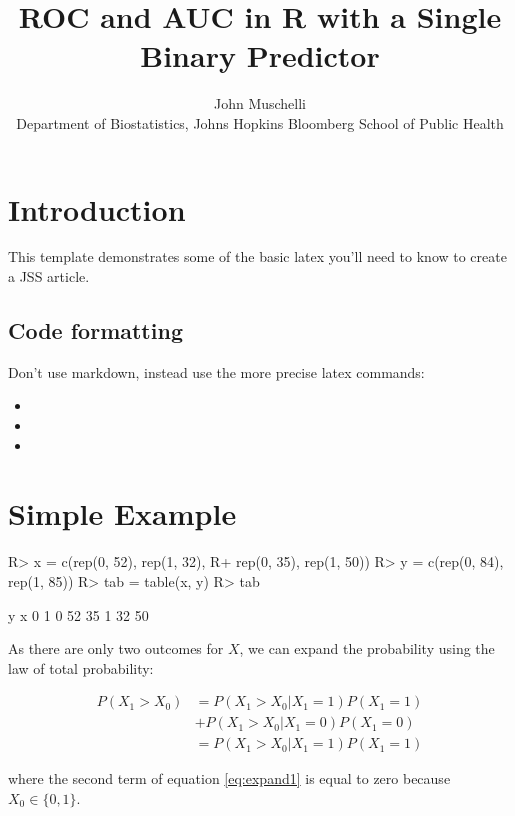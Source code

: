 \documentclass[article]{jss}
\author{
John Muschelli\\Department of Biostatistics, Johns Hopkins Bloomberg School of Public
Health
}
\title{ROC and AUC in R with a Single Binary Predictor}
\providecommand{\tightlist}{%
  \setlength{\itemsep}{0pt}\setlength{\parskip}{0pt}}
\begin{document}
\section{Introduction}\label{introduction}

This template demonstrates some of the basic latex you'll need to know
to create a JSS article.

\subsection{Code formatting}\label{code-formatting}

Don't use markdown, instead use the more precise latex commands:

\begin{itemize}
\tightlist
\item
\item
\item
\end{itemize}

\section{Simple Example}\label{simple-example}

\begin{CodeChunk}

\begin{CodeInput}
R> x = c(rep(0, 52), rep(1, 32),
R+       rep(0, 35), rep(1, 50))
R> y = c(rep(0, 84), rep(1, 85))
R> tab = table(x, y)
R> tab
\end{CodeInput}

\begin{CodeOutput}
   y
x    0  1
  0 52 35
  1 32 50
\end{CodeOutput}
\end{CodeChunk}

As there are only two outcomes for \(X\), we can expand the probability
using the law of total probability:

\begin{align}
P(X_{1} > X_{0}) &= P(X_{1} > X_{0} | X_{1} = 1) P(X_{1} = 1) \nonumber \\
&+ P(X_{1} > X_{0} | X_{1} = 0) P(X_{1} = 0) \label{eq:expand1} \\
&= P(X_{1} > X_{0} | X_{1} = 1) P(X_{1} = 1) \label{eq:expand}
\end{align}

where the second term of equation \eqref{eq:expand1} is equal to zero
because \(X_{0} \in \{0, 1\}\).
\end{document}
